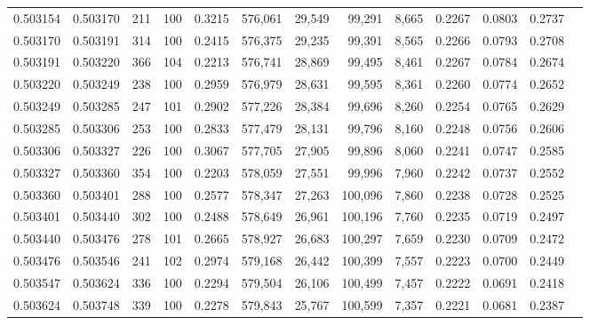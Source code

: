 \begin{tabular}{rrrrrrrrrrrrr}
0.503154 & 0.503170 &   211 & 100 &                                     0.3215 & 576,061 &  29,549 &  99,291 &   8,665 & 0.2267 & 0.0803 & 0.2737 \\
0.503170 & 0.503191 &   314 & 100 &                                     0.2415 & 576,375 &  29,235 &  99,391 &   8,565 & 0.2266 & 0.0793 & 0.2708 \\
0.503191 & 0.503220 &   366 & 104 &                                     0.2213 & 576,741 &  28,869 &  99,495 &   8,461 & 0.2267 & 0.0784 & 0.2674 \\
0.503220 & 0.503249 &   238 & 100 &                                     0.2959 & 576,979 &  28,631 &  99,595 &   8,361 & 0.2260 & 0.0774 & 0.2652 \\
0.503249 & 0.503285 &   247 & 101 &                                     0.2902 & 577,226 &  28,384 &  99,696 &   8,260 & 0.2254 & 0.0765 & 0.2629 \\
0.503285 & 0.503306 &   253 & 100 &                                     0.2833 & 577,479 &  28,131 &  99,796 &   8,160 & 0.2248 & 0.0756 & 0.2606 \\
0.503306 & 0.503327 &   226 & 100 &                                     0.3067 & 577,705 &  27,905 &  99,896 &   8,060 & 0.2241 & 0.0747 & 0.2585 \\
0.503327 & 0.503360 &   354 & 100 &                                     0.2203 & 578,059 &  27,551 &  99,996 &   7,960 & 0.2242 & 0.0737 & 0.2552 \\
0.503360 & 0.503401 &   288 & 100 &                                     0.2577 & 578,347 &  27,263 & 100,096 &   7,860 & 0.2238 & 0.0728 & 0.2525 \\
0.503401 & 0.503440 &   302 & 100 &                                     0.2488 & 578,649 &  26,961 & 100,196 &   7,760 & 0.2235 & 0.0719 & 0.2497 \\
0.503440 & 0.503476 &   278 & 101 &                                     0.2665 & 578,927 &  26,683 & 100,297 &   7,659 & 0.2230 & 0.0709 & 0.2472 \\
0.503476 & 0.503546 &   241 & 102 &                                     0.2974 & 579,168 &  26,442 & 100,399 &   7,557 & 0.2223 & 0.0700 & 0.2449 \\
0.503547 & 0.503624 &   336 & 100 &                                     0.2294 & 579,504 &  26,106 & 100,499 &   7,457 & 0.2222 & 0.0691 & 0.2418 \\
0.503624 & 0.503748 &   339 & 100 &                                     0.2278 & 579,843 &  25,767 & 100,599 &   7,357 & 0.2221 & 0.0681 & 0.2387 \\

\end{tabular}
